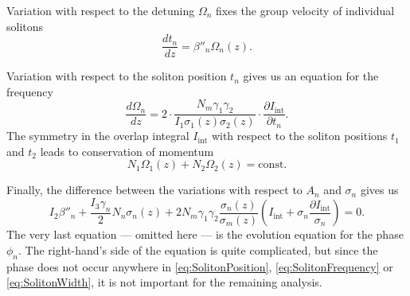 \documentclass[aps, pra, signlecolumn, superscriptaddress, final, 11pt]{revtex4}
\begin{document}
Variation with respect to the detuning $\Omega_{n}$ fixes the group velocity of individual solitons
\begin{equation}
  \label{eq:SolitonPosition}
  \frac{d t_{n}}{dz} = \beta''_{n} \Omega_{n}(z).
\end{equation}

Variation with respect to the soliton position $t_{n}$ gives us an equation for the frequency
\begin{equation}
  \label{eq:SolitonFrequency}
  \frac{d \Omega_{n}}{dz} =
    2 \cdot \frac{N_{m} \gamma_{1} \gamma_{2}}
           {I_{1} \sigma_{1}(z) \sigma_{2}(z)} \cdot
    \frac{\partial I_{\text{int}}}{\partial t_{n}}.
\end{equation}
The symmetry in the overlap integral $I_{\text{int}}$ with respect to the soliton positions $t_{1}$ and $t_{2}$ leads to conservation of momentum
\begin{equation}
  \label{eq:ConservationOfMomentum}
  N_{1} \Omega_{1}(z) + N_{2} \Omega_{2}(z) = \mathrm{const}.
\end{equation}

Finally, the difference between the variations with respect to $A_{n}$ and $\sigma_{n}$ gives us
\begin{equation}
  \label{eq:SolitonWidth}
  I_{2} \beta''_{n} +
  \frac{I_{3} \gamma_{n}}{2} N_{n} \sigma_{n}(z)
  + 2 N_{m} \gamma_{1} \gamma_{2} \frac{\sigma_{n}(z)}{\sigma_{m}(z)} \left(
    I_{\text{int}} + \sigma_{n} \frac{\partial I_{\text{int}}}{\sigma_{n}}
  \right) = 0.
\end{equation}
The very last equation --- omitted here --- is the evolution equation for the phase $\phi_{n}$. The right-hand's side of the equation is quite complicated, but since the phase does not occur anywhere in \eqref{eq:SolitonPosition}, \eqref{eq:SolitonFrequency} or \eqref{eq:SolitonWidth}, it is not important for the remaining analysis.
\end{document}

